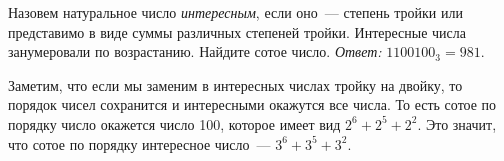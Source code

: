 \problem
Назовем натуральное число \emph{интересным}, если оно~--- степень тройки или
представимо в виде суммы различных степеней тройки.
Интересные числа занумеровали по возрастанию.
Найдите сотое число.
\solution
\emph{Ответ:} $1100100_3 = 981$.
\par
Заметим, что если мы заменим в интересных числах тройку на двойку, то порядок
чисел сохранится и интересными окажутся все числа.
То есть сотое по порядку число окажется число 100, которое имеет вид
$2^{6} + 2^{5} + 2^{2}$.
Это значит, что сотое по порядку интересное число~--- $3^6 + 3^5 + 3^2$.
\endproblem
